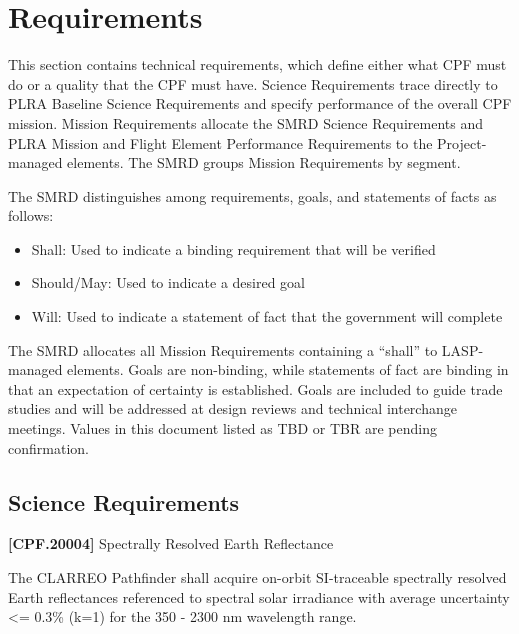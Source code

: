 \documentclass[12pt,oneside,oldfontcommands]{memoir}
\begin{document}
\chapter{Requirements  }
\label{sec_req}

\renewcommand\labelitemi{}

This section contains technical requirements, which define either what \gls{CPF} must do or a quality that the \gls{CPF} must have. Science Requirements trace directly to PLRA Baseline Science Requirements and specify performance of the overall \gls{CPF} mission. Mission Requirements allocate the \gls{SMRD} Science Requirements and PLRA Mission and Flight Element Performance Requirements to the Project-managed elements. The \gls{SMRD} groups Mission Requirements by segment.

The \gls{SMRD} distinguishes among requirements, goals, and statements of facts as follows:

\begin{itemize}
\item{} Shall: Used to indicate a binding requirement that will be verified

\item{} Should\slash May: Used to indicate a desired goal

\item{} Will: Used to indicate a statement of fact that the government will complete

\end{itemize}

The \gls{SMRD} allocates all Mission Requirements containing a ``shall'' to \gls{LASP}-managed elements. Goals are non-binding, while statements of fact are binding in that an expectation of certainty is established. Goals are included to guide trade studies and will be addressed at design reviews and technical interchange meetings. Values in this document listed as TBD or TBR are pending confirmation.

\section{Science Requirements}
\label{sciencerequirements}

\textbf{[CPF.20004]} Spectrally Resolved Earth Reflectance

The \gls{CLARREO} Pathfinder shall acquire on-orbit \gls{SI}-traceable spectrally resolved Earth reflectances referenced to spectral solar irradiance with average uncertainty <= 0.3\% (k=1) for the 350 - 2300 nm wavelength range.
\end{document}
